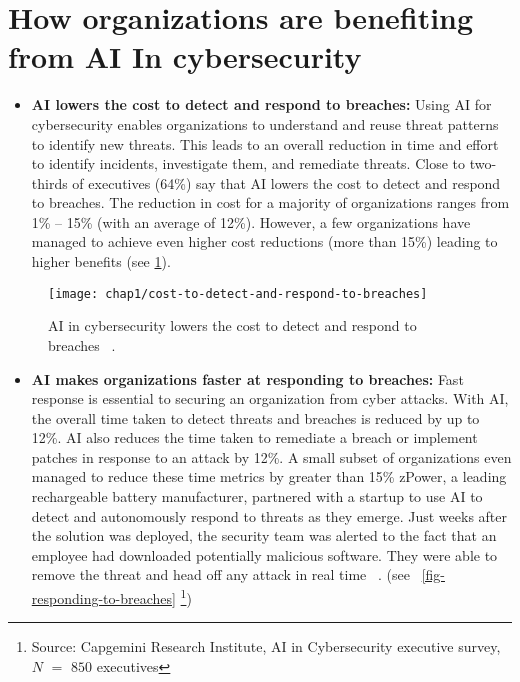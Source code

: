 \section{How organizations are benefiting from AI In cybersecurity}

\begin{itemize}
   \item {
      \textbf{AI lowers the cost to detect and respond to breaches:} Using AI for cybersecurity enables organizations to understand and reuse 
      threat patterns to identify new threats. This leads to an overall reduction in time and effort to identify incidents, investigate them, and remediate threats.
      Close to two-thirds of executives (64\%) say that AI lowers the cost to detect and respond to breaches. The reduction in cost for a majority of organizations ranges from 1\% – 15\% (with an average of 12\%). 
      However, a few organizations have managed to achieve even higher cost reductions (more than 15\%) leading to higher benefits (see \ref{fig-cost-to-detect-and-respond-to-breaches}).
      }
\end{itemize}

\begin{figure}
   \center
   \texttt{[image: chap1/cost-to-detect-and-respond-to-breaches]} 
   \caption{AI in cybersecurity lowers the cost to detect and respond to breaches ~\cite{Capgemini2019}.}
   \label{fig-cost-to-detect-and-respond-to-breaches}
\end{figure}

\begin{itemize}
   \item {
      \textbf{AI makes organizations faster at responding to breaches:}
      Fast response is essential to securing an organization from cyber attacks. With AI, the overall time taken to detect threats and breaches is reduced by up to 12\%. 
      AI also reduces the time taken to remediate a breach or implement patches in response to an attack by 12\%. A small subset of organizations even managed to reduce these time metrics by greater than 15\%
      zPower, a leading rechargeable battery manufacturer, partnered with a startup to use AI to detect and autonomously respond to threats as they emerge. Just weeks after the solution was deployed, 
      the security team was alerted to the fact that an employee had downloaded potentially malicious software. They were able to remove the threat and head off any attack in real time ~\cite{Darktrace2017}.
      (see ~\ref{fig-responding-to-breaches} \footnote{Source: Capgemini Research Institute, AI in Cybersecurity executive survey, $N$ $=$ $850$ executives})
      }
\end{itemize}

